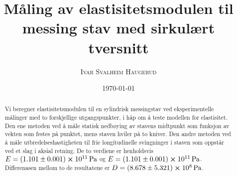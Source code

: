\documentclass[%
 reprint,
 amsmath,amssymb,
 aps,
]{revtex4-1}
\begin{document}
\title{Måling av elastisitetsmodulen til messing stav med sirkulært tversnitt}
\author{\textsc{Ivar Svalheim Haugerud}}
\date{\today}

\begin{abstract}
  Vi beregner elastisitetsmodulen til en sylindrisk messingstav ved eksperimentelle målinger med to forskjellige utgangspunkter, i håp om å teste modellen for elastisitet. Den ene metoden ved å måle statisk nedbøying av stavens midtpunkt som funksjon av vekten som festes på punktet, mens staven hviler på to kniver. Den andre metoden ved å måle utbredelseshastigheten til frie longitudinelle svingninger i staven som oppstår ved et slag i aksial retning. De to verdiene er henholdsvis
  $E = (1.101\pm0.001)\cross \SI{e11}{\pascal}$ og $E=(1.101\pm0.001)\cross \SI{e11}{\pascal}$. Differenasen mellom to de resultatene er $D=(8.678\pm5.321)\cross\SI{e8}{\pascal}$.
\end{abstract}

\maketitle

\end{document}
